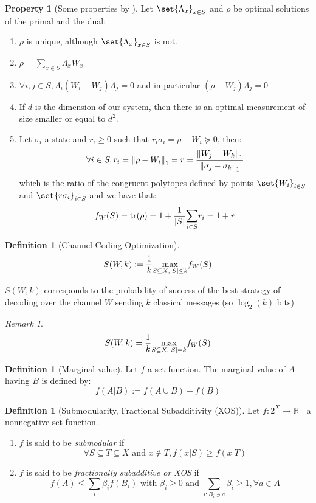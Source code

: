 \documentclass{article}
\theoremstyle{definition}
\newtheorem{prop}[theo]{Property}
\newtheorem{defi}[theo]{Definition}
\theoremstyle{remark}
\newtheorem*{rk}{Remark}
\begin{document}
\begin{prop}[Some properties by \cite{Bae13,BK15}]
  \label{propBae}
  Let $\set{\Lambda_x}_{x \in S}$ and $\rho$ be optimal solutions of the primal and the dual:
  \begin{enumerate}[label={(\arabic*)}]
    \item $\rho$ is unique, although $\set{\Lambda_x}_{x \in S}$ is not.
    \item $\rho = \underset{x \in S}{\sum} \Lambda_x W_x$
    \item $\forall i,j \in S, \Lambda_i(W_i-W_j)\Lambda_j = 0$ and in particular $(\rho-W_j)\Lambda_j = 0$
    \item If $d$ is the dimension of our system, then there is an optimal measurement of size smaller or equal to $d^2$.
    \item Let $\sigma_i$ a state and $r_i \geq 0$ such that $r_i\sigma_i = \rho - W_i \succcurlyeq 0$, then:
      \[ \forall i \in S, r_i = \norm{\rho - W_i}_1 = r = \frac{\norm{W_j-W_k}_1}{\norm{\sigma_j-\sigma_k}_1}\]
      which is the ratio of the congruent polytopes defined by points $\set{W_i}_{i \in S}$ and $\set{r\sigma_i}_{i \in S}$ and we have that:
      \[ f_W(S) = \tr(\rho) = 1 + \frac{1}{\abs{S}}\underset{i \in S}{\sum} r_i = 1 + r \]
    \end{enumerate}
\end{prop}

\begin{defi}[Channel Coding Optimization]
  \[ S(W,k) := \frac{1}{k} \underset{S \subseteq X, \abs{S} \leq k}{\max} f_W(S) \]
\end{defi}

$S(W,k)$ corresponds to the probability of success of the best strategy of decoding over the channel $W$ sending $k$ classical messages (so $\log_2(k)$ bits)

\begin{rk}
  \[ S(W,k) = \frac{1}{k} \underset{S \subseteq X, \abs{S} = k}{\max} f_W(S) \]
\end{rk}
\begin{defi}[Marginal value]
  Let $f$ a set function. The marginal value of $A$ having $B$ is defined by:
  \[  f(A|B) := f(A \cup B) - f(B) \]
\end{defi}

\begin{defi}[Submodularity, Fractional Subadditivity (XOS)]
  Let $f : 2^X \rightarrow \mathbb{R}^+$ a nonnegative set function.
  \begin{enumerate}[label={(\arabic*)}]
    \item $f$ is said to be \emph{submodular} if
      \[ \forall S \subseteq T \subseteq X \text{ and } x \not\in T, f(x|S) \geq f(x|T) \]
    \item $f$ is said to be \emph{fractionally subadditive or XOS} if
      \[ f(A) \leq \underset{i}{\sum}\beta_if(B_i) \text{ with } \beta_i \geq 0 \text{ and } \underset{i : B_i \ni a}{\sum} \beta_i \geq 1, \forall a \in A\]
  \end{enumerate}
\end{defi}
\end{document}
